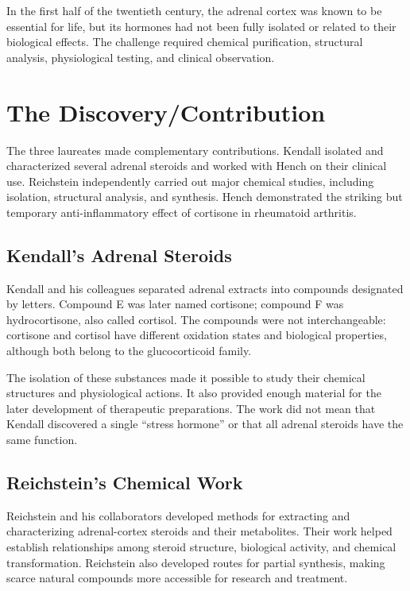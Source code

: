 In the first half of the twentieth century, the adrenal cortex was known to be essential for life, but its hormones had not been fully isolated or related to their biological effects. The challenge required chemical purification, structural analysis, physiological testing, and clinical observation.

\section{The Discovery/Contribution}

The three laureates made complementary contributions. Kendall isolated and characterized several adrenal steroids and worked with Hench on their clinical use. Reichstein independently carried out major chemical studies, including isolation, structural analysis, and synthesis. Hench demonstrated the striking but temporary anti-inflammatory effect of cortisone in rheumatoid arthritis.

\subsection{Kendall's Adrenal Steroids}

Kendall and his colleagues separated adrenal extracts into compounds designated by letters. Compound E was later named cortisone; compound F was hydrocortisone, also called cortisol. The compounds were not interchangeable: cortisone and cortisol have different oxidation states and biological properties, although both belong to the glucocorticoid family.

The isolation of these substances made it possible to study their chemical structures and physiological actions. It also provided enough material for the later development of therapeutic preparations. The work did not mean that Kendall discovered a single ``stress hormone'' or that all adrenal steroids have the same function.

\subsection{Reichstein's Chemical Work}

Reichstein and his collaborators developed methods for extracting and characterizing adrenal-cortex steroids and their metabolites. Their work helped establish relationships among steroid structure, biological activity, and chemical transformation. Reichstein also developed routes for partial synthesis, making scarce natural compounds more accessible for research and treatment.

